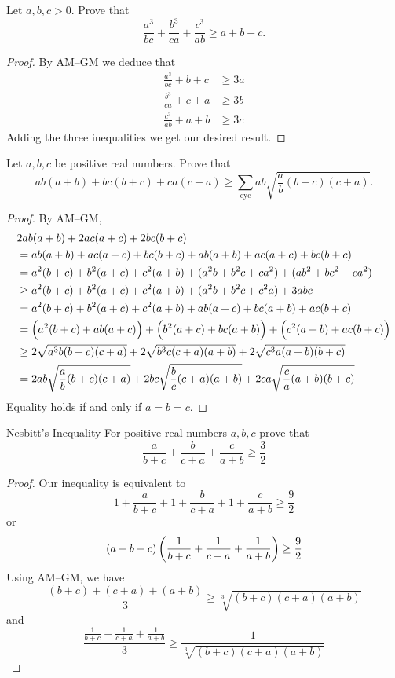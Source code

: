 \begin{exmp}{}{}
Let $a, b, c > 0$. Prove that
\[ \frac{a^3}{bc} + \frac{b^3}{ca} + \frac{c^3}{ab} \ge a+b+c. \]
\end{exmp}
\begin{proof}
By AM--GM we deduce that
\begin{align*}
\frac{a^3}{bc} + b + c &\ge 3a \\
\frac{b^3}{ca} + c + a &\ge 3b \\
\frac{c^3}{ab} + a + b &\ge 3c
\end{align*}
Adding the three inequalities we get our desired result.
\end{proof}

\begin{exmp}{}{}
Let $a, b, c$ be positive real numbers. Prove that
\[ ab(a+b)+bc(b+c)+ca(c+a) \ge \sum_\text{cyc} ab\sqrt{\frac{a}{b}(b+c)(c+a)}. \]
\end{exmp}
\begin{proof}
By AM--GM,
\begin{align*}
&2ab(a+b)+2ac(a+c)+2bc(b+c) \\
&= ab(a+b)+ac(a+c)+bc(b+c)+ab(a+b)+ac(a+c)+bc(b+c) \\
&= a^2(b+c)+b^2(a+c)+c^2(a+b)+(a^2b+b^2c+ca^2)+(ab^2+bc^2+ca^2) \\
&\ge a^2(b+c)+b^2(a+c)+c^2(a+b)+(a^2b+b^2c+c^2a)+3abc \\
&= a^2(b+c)+b^2(a+c)+c^2(a+b)+ab(a+c)+bc(a+b)+ac(b+c) \\
&= \left(a^2(b+c)+ab(a+c)\right)+\left(b^2(a+c)+bc(a+b)\right)+\left(c^2(a+b)+ac(b+c)\right) \\
&\ge 2\sqrt{a^3b(b+c)(c+a)}+2\sqrt{b^3c(c+a)(a+b)}+2\sqrt{c^3a(a+b)(b+c)} \\
&= 2ab\sqrt{\frac{a}{b}(b+c)(c+a)}+2bc\sqrt{\frac{b}{c}(c+a)(a+b)}+2ca\sqrt{\frac{c}{a}(a+b)(b+c)}
\end{align*}
Equality holds if and only if $a=b=c$.
\end{proof}

\begin{exmp}{Nesbitt's Inequality}{}
For positive real numbers $a, b, c$ prove that
\[ \frac{a}{b+c} + \frac{b}{c+a} + \frac{c}{a+b} \ge \frac{3}{2} \]
\end{exmp}
\begin{proof}
Our inequality is equivalent to
\[ 1 + \frac{a}{b+c} + 1 + \frac{b}{c+a} + 1 + \frac{c}{a+b} \ge \frac{9}{2} \]
or 
\[ (a+b+c)\left(\frac{1}{b+c}+\frac{1}{c+a}+\frac{1}{a+b}\right) \ge \frac{9}{2} \]
Using AM--GM, we have
\[ \frac{(b+c)+(c+a)+(a+b)}{3} \ge \sqrt[3]{(b+c)(c+a)(a+b)} \]
and 
\[ \frac{\frac{1}{b+c}+\frac{1}{c+a}+\frac{1}{a+b}}{3} \ge \frac{1}{\sqrt[3]{(b+c)(c+a)(a+b)}} \]
\end{proof}


